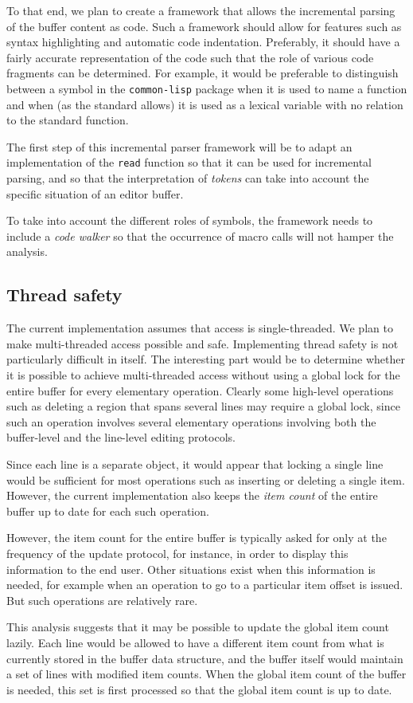 To that end, we plan to create a framework that allows the incremental
parsing of the buffer content as \commonlisp{} code.  Such a
framework should allow for features such as syntax highlighting and
automatic code indentation.  Preferably, it should have a fairly
accurate representation of the code such that the role of various code
fragments can be determined.  For example, it would be preferable to
distinguish between a symbol in the \texttt{common-lisp} package when
it is used to name a \commonlisp{} function and when (as the
\commonlisp{} standard allows) it is used as a lexical variable with
no relation to the standard function.

The first step of this incremental parser framework will be to adapt
an implementation of the \commonlisp{} \texttt{read} function so that
it can be used for incremental parsing, and so that the interpretation
of \emph{tokens} can take into account the specific situation of an
editor buffer.

To take into account the different roles of symbols, the framework
needs to include a \emph{code walker} so that the occurrence of macro
calls will not hamper the analysis.

\subsection{Thread safety}

The current implementation assumes that access is single-threaded.  We
plan to make multi-threaded access possible and safe.  Implementing
thread safety is not particularly difficult in itself.  The
interesting part would be to determine whether it is possible to
achieve multi-threaded access without using a global lock for the
entire buffer for every elementary operation.  Clearly some high-level
operations such as deleting a region that spans several lines may
require a global lock, since such an operation involves several
elementary operations involving both the buffer-level and the
line-level editing protocols.

Since each line is a separate object, it would appear that locking a
single line would be sufficient for most operations such as inserting
or deleting a single item.  However, the current implementation also
keeps the \emph{item count} of the entire buffer up to date for each
such operation.

However, the item count for the entire buffer is typically asked for
only at the frequency of the update protocol, for instance, in order
to display this information to the end user.  Other situations exist
when this information is needed, for example when an operation to go
to a particular item offset is issued.  But such operations are
relatively rare.

This analysis suggests that it may be possible to update the global
item count lazily.  Each line would be allowed to have a different
item count from what is currently stored in the buffer data structure,
and the buffer itself would maintain a set of lines with modified item
counts.  When the global item count of the buffer is needed, this set
is first processed so that the global item count is up to date.
